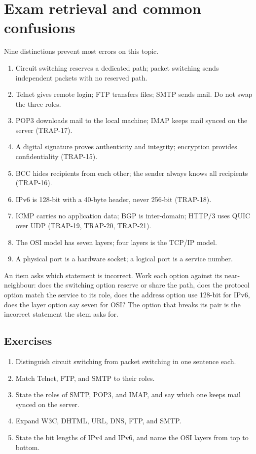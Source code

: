 \section{Exam retrieval and common confusions}
Nine distinctions prevent most errors on this topic.
\begin{enumerate}
  \item Circuit switching reserves a dedicated path; packet switching sends
    independent packets with no reserved path.
  \item Telnet gives remote login; FTP transfers files; SMTP sends mail. Do
    not swap the three roles.
  \item POP3 downloads mail to the local machine; IMAP keeps mail synced on
    the server (TRAP-17).
  \item A digital signature proves authenticity and integrity; encryption
    provides confidentiality (TRAP-15).
  \item BCC hides recipients from each other; the sender always knows all
    recipients (TRAP-16).
  \item IPv6 is 128-bit with a 40-byte header, never 256-bit (TRAP-18).
  \item ICMP carries no application data; BGP is inter-domain; HTTP/3 uses
    QUIC over UDP (TRAP-19, TRAP-20, TRAP-21).
  \item The OSI model has seven layers; four layers is the TCP/IP model.
  \item A physical port is a hardware socket; a logical port is a service
    number.
\end{enumerate}

\begin{example}
An item asks which statement is incorrect. Work each option against its
near-neighbour: does the switching option reserve or share the path, does
the protocol option match the service to its role, does the address option
use 128-bit for IPv6, does the layer option say seven for OSI? The option
that breaks its pair is the incorrect statement the stem asks for.
\end{example}

\subsection*{Exercises}
\begin{enumerate}[label=\arabic*.]
  \item Distinguish circuit switching from packet switching in one sentence
    each.
  \item Match Telnet, FTP, and SMTP to their roles.
  \item State the roles of SMTP, POP3, and IMAP, and say which one keeps mail
    synced on the server.
  \item Expand W3C, DHTML, URL, DNS, FTP, and SMTP.
  \item State the bit lengths of IPv4 and IPv6, and name the OSI layers from
    top to bottom.
\end{enumerate}

